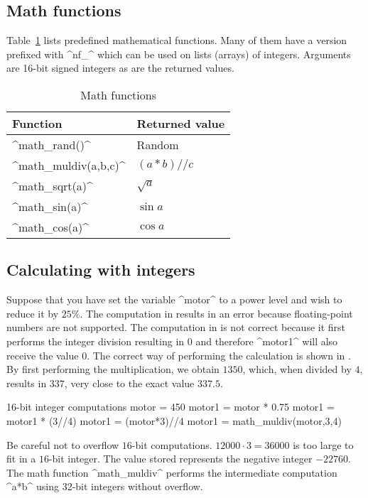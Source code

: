 \documentclass[11pt,a4paper]{article}
\newcommand*{\li}[1]{{\footnotesize\textsf{\ddag #1}}}
\begin{document}
\subsection{Math functions}

Table~\ref{t.math} lists predefined mathematical functions. Many of them have a version prefixed with ^nf_^ which can be used on lists (arrays) of integers. Arguments are 16-bit signed integers as are the returned values.

\begin{table}[htb]
\renewcommand{\arraystretch}{.85}
\begin{center}
\begin{tabular}{|l|l|}
\hline
Function& Returned value\\\hline
^math_rand()^& Random\\
^math_muldiv(a,b,c)^& $(a*b)//c$ \\
^math_sqrt(a)^&$\sqrt{a}$\\
\hline
^math_sin(a)^&$\sin a$\\
^math_cos(a)^&$\cos a$\\
\hline
\end{tabular}
\end{center}
\caption{Math functions}\label{t.math}
\end{table}

\subsection{Calculating with integers}

Suppose that you have set the variable ^motor^ to a power level and wish to reduce it by $25\%$. The computation in \li{2} results in an error because floating-point numbers are not supported. The computation in \li{3} is not correct because it first performs the integer division resulting in $0$ and therefore ^motor1^ will also receive the value $0$. The correct way of performing the calculation is shown in \li{4}. By first performing the multiplication, we obtain $1350$, which, when divided by $4$, results in $337$, very close to the exact value $337.5$.

\begin{progln}{16-bit integer computations}
motor = 450
motor1 = motor * 0.75
motor1 = motor1 * (3//4)
motor1 = (motor*3)//4
motor1 = math_muldiv(motor,3,4)
\end{progln}

Be careful not to overflow $16$-bit computations. $12000\cdot 3=36000$ is too large to fit in a $16$-bit integer. The value stored represents the negative integer $-22760$.  The math function ^math_muldiv^ \li{5} performs the intermediate computation ^a*b^ using 32-bit integers without overflow.
\end{document}
